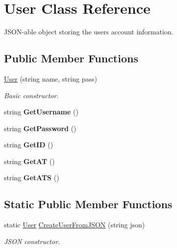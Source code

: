 \hypertarget{class_user}{}\section{User Class Reference}
\label{class_user}


J\+S\+O\+N-\/able object storing the user\textquotesingle{}s account information.  


\subsection*{Public Member Functions}
\begin{DoxyCompactItemize}
\item 
\mbox{\label{class_user_a340ae260388cc9beadce82a506e3fe39}} 
\mbox{\hyperlink{class_user_a340ae260388cc9beadce82a506e3fe39}{User}} (string name, string pass)
\begin{DoxyCompactList}\small\item\em Basic constructor. \end{DoxyCompactList}\item 
\mbox{\label{class_user_a9b01c32e62c89a10e380f6cdfa19b8b0}} 
string {\bfseries Get\+Username} ()
\item 
\mbox{\label{class_user_a19477827d4e7de7ed4e1c3356aec3e81}} 
string {\bfseries Get\+Password} ()
\item 
\mbox{\label{class_user_a91e7a9a20ab853c8291c19e3b607ddeb}} 
string {\bfseries Get\+ID} ()
\item 
\mbox{\label{class_user_a208b67765760712a54a3c354f351ab34}} 
string {\bfseries Get\+AT} ()
\item 
\mbox{\label{class_user_ab1bd8f0f2b784942840ab712e61a3979}} 
string {\bfseries Get\+A\+TS} ()
\end{DoxyCompactItemize}
\subsection*{Static Public Member Functions}
\begin{DoxyCompactItemize}
\item 
\mbox{\label{class_user_ab083d14c7cefbeb5eb91eb9ebb21a3bd}} 
static \mbox{\hyperlink{class_user}{User}} \mbox{\hyperlink{class_user_ab083d14c7cefbeb5eb91eb9ebb21a3bd}{Create\+User\+From\+J\+S\+ON}} (string json)
\begin{DoxyCompactList}\small\item\em J\+S\+ON constructor. \end{DoxyCompactList}\end{DoxyCompactItemize}
